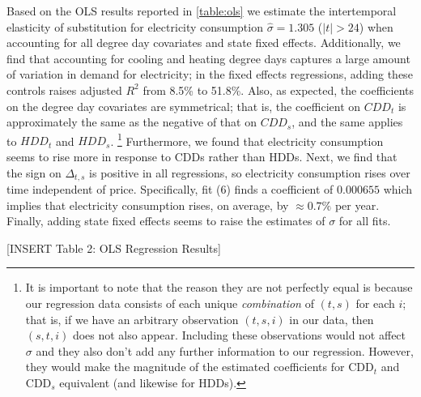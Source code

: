 \documentclass[11pt,a4paper,leqno]{extarticle}
\begin{document}
	
	Based on the OLS results reported in \autoref{table:ols} we estimate the intertemporal elasticity of substitution for electricity consumption $\hat{\sigma}  = 1.305$ ($|t| > 24$) when accounting for all degree day covariates and state fixed effects. Additionally, we find that accounting for cooling and heating degree days captures a large amount of variation in demand for electricity; in the fixed effects regressions, adding these controls raises adjusted $R^2$ from 8.5\% to 51.8\%. Also, as expected, the coefficients on the degree day covariates are symmetrical; that is, the coefficient on $CDD_{t}$ is approximately the same as the negative of that on $CDD_{s}$, and the same applies to $HDD_{t}$ and $HDD_{s}$. \footnote{It is important to note that the reason they are not perfectly equal is because our regression data consists of each unique \textit{combination} of $(t,s)$ for each $i$; that is, if we have an arbitrary observation $(t,s,i)$ in our data, then $(s,t,i)$ does not also appear. Including these observations would not affect $\sigma$ and they also don't add any further information to our regression. However, they would make the magnitude of the estimated coefficients for  CDD$_t$ and CDD$_s$ equivalent (and likewise for HDDs). }  Furthermore, we found that electricity consumption seems to rise more in response to CDDs rather than HDDs.  Next, we find that the sign on $\Delta_{t,s}$ is positive in all regressions, so electricity consumption rises over time independent of price. Specifically, fit (6) finds a coefficient of $0.000655$ which implies that electricity consumption rises, on average, by $\approx 0.7\%$ per year. Finally, adding state fixed effects seems to raise the estimates of $\sigma$ for all fits. 
	
	\vspace{0.15in}
	\begin{center}
		[INSERT Table 2: OLS Regression Results]
	\end{center}
	\vspace{0.15in}
	
\end{document}
